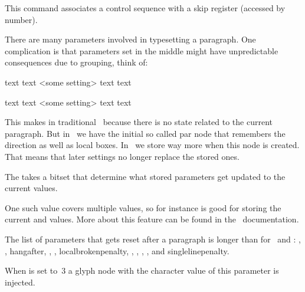 \stopoldprimitive

\startoldprimitive[title={\prm {skipdef}}]

This command associates a control sequence with a skip register (accessed by number).

\stopoldprimitive

\startnewprimitive[title={\prm {snapshotpar}}]

There are many parameters involved in typesetting a paragraph. One complication
is that parameters set in the middle might have unpredictable consequences due to
grouping, think of:

\starttyping
text  text <some setting> text   text \par
text {text <some setting> text } text \par
\stoptyping

This makes in traditional \TEX\ because there is no state related to the current
paragraph. But in \LUATEX\ we have the initial so called par node that remembers
the direction as well as local boxes. In \LUAMETATEX\ we store way more when this
node is created. That means that later settings no longer replace the stored ones.

The  takes a bitset that determine what stored parameters get
updated to the current values.

\startthreerows
{}
\stopthreerows

One such value covers multiple values, so for instance  is good for
storing the current  and  values. More about this
feature can be found in the \CONTEXT\ documentation.

The list of parameters that gets reset after a paragraph is longer than for
\PDFTEX\ and \LUAMETATEX: , , \prm
{hangafter}, , , \prm
{localbrokenpenalty}, , ,
, ,  and \prm
{singlelinepenalty}.

\stopnewprimitive

\startnewprimitive[title={\prm {spacechar}}]

When  is set to~3 a glyph node with the character value of
this parameter is injected.

\stopnewprimitive

\startoldprimitive[title={\prm {spacefactor}}]

